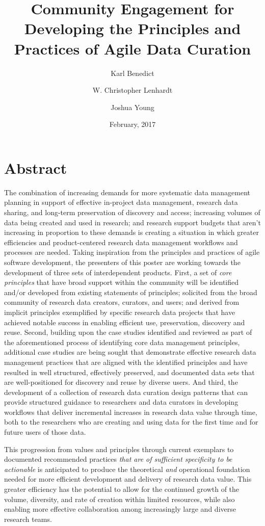 \documentclass[poster,17]{idcc}
\title{Community Engagement for Developing the Principles and Practices of
Agile Data Curation}
\author{Karl Benedict}
\affil{University Libraries, University of New Mexico}
\author{W. Christopher Lenhardt}
\affil{Renaissance Computing Institute (RENCI)}
\author{Joshua Young}
\affil{University Corporation for Atmospheric Research (UCAR)}
\date{February, 2017}
\begin{document}
\maketitle

\section{Abstract}
The combination of increasing demands for more systematic data
management planning in support of effective in-project data management,
research data sharing, and long-term preservation of discovery and
access; increasing volumes of data being created and used in research;
and research support budgets that aren't increasing in proportion to
these demands is creating a situation in which greater efficiencies and
product-centered research data management workflows and processes are
needed. Taking inspiration from the principles and practices of agile
software development, the presenters of this poster are working towards
the development of three sets of interdependent products. First, a set
of \emph{core principles} that have broad support within the community
will be identified and/or developed from existing statements of
principles; solicited from the broad community of research data
creators, curators, and users; and derived from implicit principles
exemplified by specific research data projects that have achieved
notable success in enabling efficient use, preservation, discovery and
reuse. Second, building upon the case studies identified and reviewed as
part of the aforementioned process of identifying core data management
principles, additional case studies are being sought that demonstrate
effective research data management practices that are aligned with the
identified principles and have resulted in well structured, effectively
preserved, and documented data sets that are well-positioned for
discovery and reuse by diverse users. And third, the development of a
collection of research data curation design patterns that can provide
structured guidance to researchers and data curators in developing
workflows that deliver incremental increases in research data value
through time, both to the researchers who are creating and using data
for the first time and for future users of those data.

This progression from values and principles through current exemplars to
documented recommended practices \emph{that are of sufficient
specificity to be actionable} is anticipated to produce the theoretical
\emph{and} operational foundation needed for more efficient development
and delivery of research data value. This greater efficiency has the
potential to allow for the continued growth of the volume, diversity,
and rate of creation within limited resources, while also enabling more
effective collaboration among increasingly large and diverse research
teams.
\end{document}
